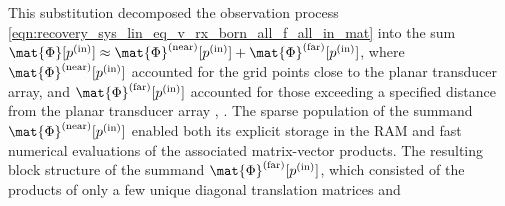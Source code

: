 This substitution decomposed
the observation process
\eqref{eqn:recovery_sys_lin_eq_v_rx_born_all_f_all_in_mat} into
the sum
$\mat{\Phi}[ p^{(\text{in})} ] \approx \mat{\Phi}^{(\text{near})}[ p^{(\text{in})} ] + \mat{\Phi}^{(\text{far})}[ p^{(\text{in})} ]$, where
$\mat{\Phi}^{(\text{near})}[ p^{(\text{in})} ]$ accounted for
the grid points close to
the planar transducer array, and
$\mat{\Phi}^{(\text{far})}[ p^{(\text{in})} ]$ accounted for
those exceeding
a specified distance from
the planar transducer array
\cite[Sect. 9.1]{book:Gibson2014},
\cite[(8) and (23)]{article:CoifmanIAPM1993}.
The sparse population of
the summand
$\mat{\Phi}^{(\text{near})}[ p^{(\text{in})} ]$ enabled both
its explicit storage in
the \ac{RAM} and
fast numerical evaluations of
the associated matrix-vector products.
The resulting block structure of
the summand
$\mat{\Phi}^{(\text{far})}[ p^{(\text{in})} ]$, which consisted of
the products of
only a few unique
diagonal translation matrices and
